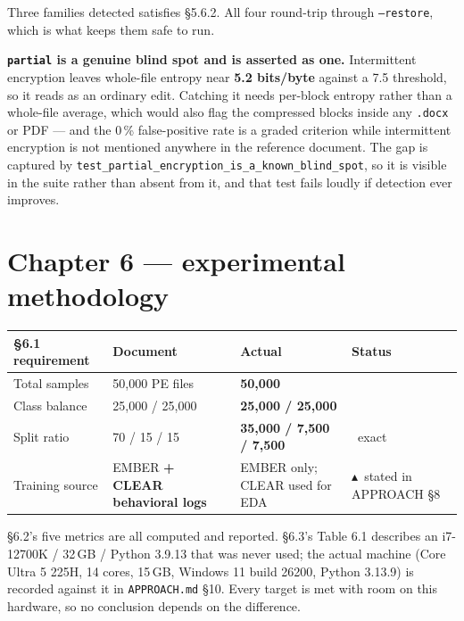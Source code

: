 \documentclass[11pt,a4paper]{article}
\newcommand{\ok}{\textcolor{okgreen}{\ding{51}}}
\newcommand{\warn}{\textcolor{warnamber}{$\blacktriangle$}}
\begin{document}
Three families detected satisfies \S5.6.2. All four round-trip through
\texttt{--restore}, which is what keeps them safe to run.

\textbf{\texttt{partial} is a genuine blind spot and is asserted as one.} Intermittent
encryption leaves whole-file entropy near \textbf{5.2 bits/byte} against a 7.5
threshold, so it reads as an ordinary edit. Catching it needs per-block entropy
rather than a whole-file average, which would also flag the compressed blocks
inside any \texttt{.docx} or PDF --- and the 0\,\% false-positive rate is a graded criterion
while intermittent encryption is not mentioned anywhere in the reference
document. The gap is captured by
\texttt{test\_\allowbreak partial\_\allowbreak encryption\_\allowbreak is\_\allowbreak a\_\allowbreak known\_\allowbreak blind\_\allowbreak spot},
so it is visible in the suite rather than absent from it, and that test fails loudly
if detection ever improves.

\section{Chapter 6 --- experimental methodology}

\begin{center}
\begin{tabularx}{\linewidth}{@{}P{3.2cm}Y{1.05}Y{0.95}P{2.9cm}@{}}
\toprule
\textbf{\S6.1 requirement} & \textbf{Document} & \textbf{Actual} & \textbf{Status} \\
\midrule
Total samples    & 50,000 PE files                        & \textbf{50,000}            & \ok \\
Class balance    & 25,000 / 25,000                        & \textbf{25,000 / 25,000}   & \ok \\
Split ratio      & 70 / 15 / 15                           & \textbf{35,000 / 7,500 / 7,500} & \ok\ exact \\
Training source  & EMBER \textbf{+ CLEAR behavioral logs} & EMBER only; CLEAR used for EDA & \warn\ stated in APPROACH \S8 \\
\bottomrule
\end{tabularx}
\end{center}

\S6.2's five metrics are all computed and reported. \S6.3's Table 6.1 describes an
i7-12700K / 32\,GB / Python 3.9.13 that was never used; the actual machine
(Core Ultra 5 225H, 14 cores, 15\,GB, Windows 11 build 26200, Python 3.13.9) is
recorded against it in \texttt{APPROACH.md} \S10. Every target is met with room on this
hardware, so no conclusion depends on the difference.
\end{document}
